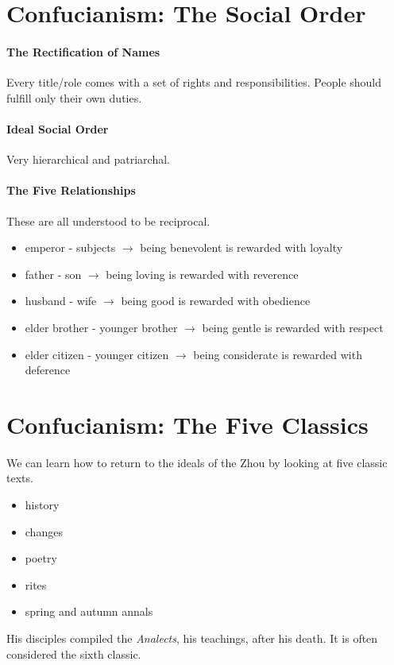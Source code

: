 \documentclass{article}
\begin{document}
\section*{Confucianism: The Social Order}
\label{sec:confucianism_the_social_order}
\paragraph{The Rectification of Names}
\label{par:the_rectification_of_names}
Every title/role comes with a set of rights and responsibilities. People should fulfill only their own duties.

\paragraph{Ideal Social Order}
\label{par:ideal_social_order}
Very hierarchical and patriarchal.

\paragraph{The Five Relationships}
\label{par:the_five_relationships}
These are all understood to be reciprocal.
\begin{itemize}
 	\item emperor - subjects $\rightarrow$  being benevolent is rewarded with loyalty
 	\item father - son $\rightarrow$ being loving is rewarded with reverence
 	\item husband - wife $\rightarrow$ being good is rewarded with obedience
 	\item elder brother - younger brother $\rightarrow$  being gentle is rewarded with respect
 	\item elder citizen - younger citizen $\rightarrow$ being considerate is rewarded with deference
 \end{itemize}

\section*{Confucianism: The Five Classics}
\label{sec:confucianism_the_five_classics}
We can learn how to return to the ideals of the Zhou by looking at five classic texts.
\begin{itemize}
	\item history
	\item changes
	\item poetry
	\item rites
	\item spring and autumn annals
\end{itemize}
His disciples compiled the \emph{Analects}, his teachings, after his death. It is often considered the sixth classic.
\end{document}
